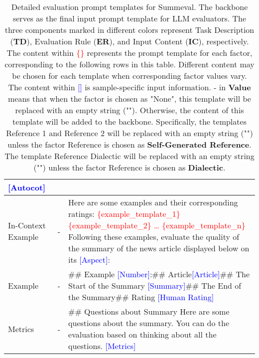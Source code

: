 \begin{table*} [t]
{\begin{tabular}{l l >{\raggedright\arraybackslash}m{}}
\textcolor{blue}{[Autocot]} \\
\midrule
\multirow{1}{*}{In-Context Example} & - & Here are some examples and their corresponding ratings: \newline
\textcolor{red}{\{example\_template\_1\}} \newline
\textcolor{red}{\{example\_template\_2\}} \newline
\textcolor{red}{…} \newline
\textcolor{red}{\{example\_template\_n\}}\newline\newline
Following these examples, evaluate the quality of the summary of the news article displayed below on its \textcolor{blue}{[Aspect]}: \\
\midrule
Example & - & \#\# Example \textcolor{blue}{[Number]}:\newline \#\# Article\newline\textcolor{blue}{[Article]}\newline\newline \#\# The Start of the Summary \newline\textcolor{blue}{[Summary]}\newline \#\# The End of the Summary\newline\newline \#\# Rating \newline \textcolor{blue}{[Human Rating]}\\
\midrule
\multirow{1}{*}{Metrics} & - & \#\# Questions about Summary \newline
Here are some questions about the summary. You can do the evaluation based on thinking about all the questions. \newline
\textcolor{blue}{[Metrics]} \\
\bottomrule
\end{tabular}
}
\vspace{-2mm}
\caption{Detailed evaluation prompt templates for Summeval. 
The backbone serves as the final input prompt template for LLM evaluators. 
The three components marked in different colors represent Task Description (\textbf{TD}), Evaluation Rule (\textbf{ER}), and Input Content (\textbf{IC}), respectively. 
The content within \textcolor{red}{\{\}} represents the prompt template for each factor, corresponding to the following rows in this table. 
Different content may be chosen for each template when corresponding factor values vary. 
The content within \textcolor{blue}{[]} is sample-specific input information. 
- in \textbf{Value} means that when the factor is chosen as "None", this template will be replaced with an empty string ("").
Otherwise, the content of this template will be added to the backbone. 
Specifically, the templates Reference 1 and Reference 2 will be replaced with an empty string ("") unless the factor Reference is chosen as \textbf{Self-Generated Reference}.
The template Reference Dialectic will be replaced with an empty string ("") unless the factor Reference is chosen as \textbf{Dialectic}.}
\label{tab:evaluation_prompt_summeval}
\end{table*}